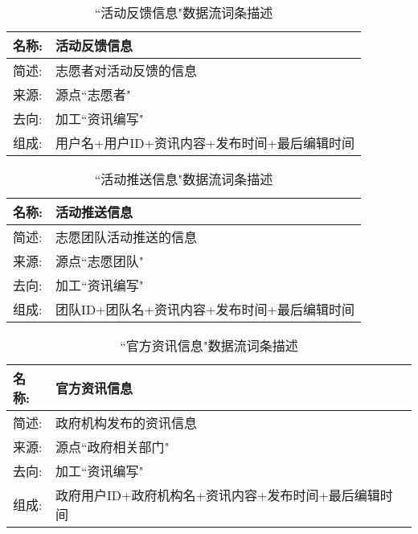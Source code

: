 \begin{table}[H]  
\caption{``活动反馈信息"数据流词条描述}  
\begin{center}  
    \begin{tabular}{l p{11cm}} 
        \hline
        \quad 名称:  &  活动反馈信息 \\
        \hline
        \quad 简述:  & 志愿者对活动反馈的信息 \\
        \hline
        \quad 来源:  & 源点``志愿者" \\
        \hline
        \quad 去向:  & 加工``资讯编写" \\
        \hline
        \quad 组成:  & 用户名+用户ID+资讯内容+发布时间+最后编辑时间 \\
        \hline
    \end{tabular}
    \label{tab1}
\end{center}
\end{table}

\begin{table}[H]  
\caption{``活动推送信息"数据流词条描述}  
\begin{center}  
    \begin{tabular}{l p{11cm}} 
        \hline
        \quad 名称:  &  活动推送信息 \\
        \hline
        \quad 简述:  & 志愿团队活动推送的信息 \\
        \hline
        \quad 来源:  & 源点``志愿团队" \\
        \hline
        \quad 去向:  & 加工``资讯编写" \\
        \hline
        \quad 组成:  & 团队ID+团队名+资讯内容+发布时间+最后编辑时间 \\
        \hline
    \end{tabular}
    \label{tab1}
\end{center}
\end{table}

\begin{table}[H]  
\caption{``官方资讯信息"数据流词条描述}  
\begin{center}  
    \begin{tabular}{l p{11cm}} 
        \hline
        \quad 名称:  &  官方资讯信息 \\
        \hline
        \quad 简述:  & 政府机构发布的资讯信息 \\
        \hline
        \quad 来源:  & 源点``政府相关部门" \\
        \hline
        \quad 去向:  & 加工``资讯编写" \\
        \hline
        \quad 组成:  & 政府用户ID+政府机构名+资讯内容+发布时间+最后编辑时间 \\
        \hline
    \end{tabular}
    \label{tab1}
\end{center}
\end{table}

